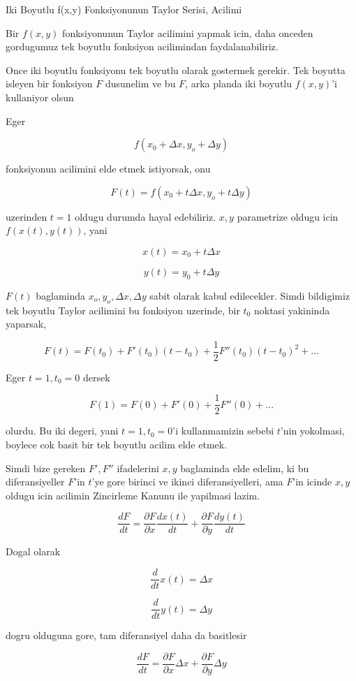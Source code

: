 \documentclass[12pt,fleqn]{article}
\begin{document}
Iki Boyutlu f(x,y) Fonksiyonunun Taylor Serisi, Acilimi

Bir $f(x,y)$ fonksiyonunun Taylor acilimini yapmak icin, daha onceden
gordugumuz tek boyutlu fonksiyon acilimindan faydalanabiliriz. 

Once iki boyutlu fonksiyonu tek boyutlu olarak gostermek gerekir. Tek
boyutta isleyen bir fonksiyon $F$ dusunelim ve bu $F$, arka planda iki
boyutlu $f(x,y)$'i kullaniyor olsun

Eger 

\[ f(x_0 +\Delta x, y_o + \Delta y) \]

fonksiyonun acilimini elde etmek istiyorsak, onu

\[ F(t) = f(x_0 + t\Delta x, y_o + t\Delta y) \]

uzerinden $t=1$ oldugu durumda hayal edebiliriz. $x,y$ parametrize 
oldugu icin  $f(x(t),y(t))$, yani

\[ x(t) = x_0 + t\Delta x \]

\[ y(t) = y_0 + t\Delta y \]

$F(t)$ baglaminda $x_o, y_o, \Delta x, \Delta y$ sabit olarak kabul edilecekler. Simdi bildigimiz
tek boyutlu Taylor acilimini bu fonksiyon uzerinde, bir $t_0$ noktasi yakininda 
yaparsak,

\[ F(t) = F(t_0) + F'(t_0)(t-t_0) + \frac{1}{2}F''(t_0)(t-t_0)^2 + ... \]

Eger $t=1,t_0=0$ dersek

\[ F(1) = F(0) + F'(0) + \frac{1}{2}F''(0) + ... \]

olurdu. Bu iki degeri, yani  $t=1,t_0=0$'i kullanmamizin sebebi $t$'nin
yokolmasi, boylece cok basit bir tek boyutlu acilim elde etmek. 

Simdi bize gereken $F',F''$ ifadelerini $x,y$ baglaminda elde edelim, ki bu
diferansiyeller $F$'in $t$'ye gore birinci ve ikinci diferansiyelleri, ama
$F$'in icinde $x,y$ oldugu icin acilimin Zincirleme Kanunu ile yapilmasi
lazim.

\[ \frac{dF}{dt} = \frac{\partial F}{\partial x}\frac{dx(t)}{dt} +
\frac{\partial F}{\partial y}\frac{dy(t)}{dt} 
 \]

Dogal olarak 

\[ \frac{d}{dt}x(t) = \Delta x \]

\[ \frac{d}{dt}y(t) = \Delta y \]

dogru olduguna gore, tam diferansiyel daha da basitlesir

\[ \frac{dF}{dt} = \frac{\partial F}{\partial x}\Delta x +
\frac{\partial F}{\partial y}\Delta y
 \]
\end{document}
